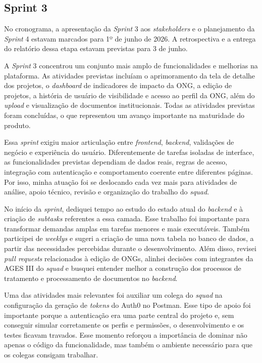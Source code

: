 \clearpage
\subsection{Sprint 3}

No cronograma, a apresentação da \textit{Sprint} 3 aos \textit{stakeholders} e o planejamento da \textit{Sprint} 4 estavam marcados para 1º de junho de 2026. A retrospectiva e a entrega do relatório dessa etapa estavam previstas para 3 de junho.

A \textit{Sprint} 3 concentrou um conjunto mais amplo de funcionalidades e melhorias na plataforma. As atividades previstas incluíam o aprimoramento da tela de detalhe dos projetos, o \textit{dashboard} de indicadores de impacto da \ac{ONG}, a edição de projetos, a história de usuário de visibilidade e acesso ao perfil da \ac{ONG}, além do \textit{upload} e visualização de documentos institucionais. Todas as atividades previstas foram concluídas, o que representou um avanço importante na maturidade do produto.

Essa \textit{sprint} exigiu maior articulação entre \textit{frontend}, \textit{backend}, validações de negócio e experiência do usuário. Diferentemente de tarefas isoladas de interface, as funcionalidades previstas dependiam de dados reais, regras de acesso, integração com autenticação e comportamento coerente entre diferentes páginas. Por isso, minha atuação foi se deslocando cada vez mais para atividades de análise, apoio técnico, revisão e organização do trabalho do \textit{squad}.

No início da \textit{sprint}, dediquei tempo ao estudo do estado atual do \textit{backend} e à criação de \textit{subtasks} referentes a essa camada. Esse trabalho foi importante para transformar demandas amplas em tarefas menores e mais executáveis. Também participei de \textit{weeklys} e sugeri a criação de uma nova tabela no banco de dados, a partir das necessidades percebidas durante o desenvolvimento. Além disso, revisei \textit{pull requests} relacionados à edição de \ac{ONGs}, alinhei decisões com integrantes da \ac{AGES} III do \textit{squad} e busquei entender melhor a construção dos processos de tratamento e processamento de documentos no \textit{backend}.

Uma das atividades mais relevantes foi auxiliar um colega do \textit{squad} na configuração da geração de \textit{tokens} do Auth0 no Postman. Esse tipo de apoio foi importante porque a autenticação era uma parte central do projeto e, sem conseguir simular corretamente os perfis e permissões, o desenvolvimento e os testes ficavam travados. Esse momento reforçou a importância de dominar não apenas o código da funcionalidade, mas também o ambiente necessário para que os colegas consigam trabalhar.

